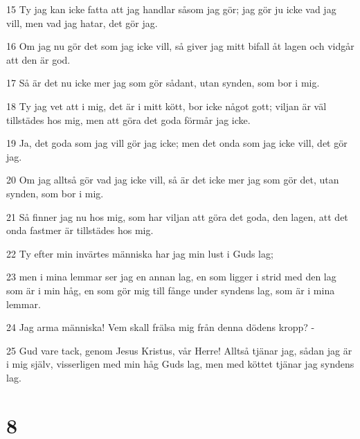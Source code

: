 \par 15 Ty jag kan icke fatta att jag handlar såsom jag gör; jag gör ju icke vad jag vill, men vad jag hatar, det gör jag.
\par 16 Om jag nu gör det som jag icke vill, så giver jag mitt bifall åt lagen och vidgår att den är god.
\par 17 Så är det nu icke mer jag som gör sådant, utan synden, som bor i mig.
\par 18 Ty jag vet att i mig, det är i mitt kött, bor icke något gott; viljan är väl tillstädes hos mig, men att göra det goda förmår jag icke.
\par 19 Ja, det goda som jag vill gör jag icke; men det onda som jag icke vill, det gör jag.
\par 20 Om jag alltså gör vad jag icke vill, så är det icke mer jag som gör det, utan synden, som bor i mig.
\par 21 Så finner jag nu hos mig, som har viljan att göra det goda, den lagen, att det onda fastmer är tillstädes hos mig.
\par 22 Ty efter min invärtes människa har jag min lust i Guds lag;
\par 23 men i mina lemmar ser jag en annan lag, en som ligger i strid med den lag som är i min håg, en som gör mig till fånge under syndens lag, som är i mina lemmar.
\par 24 Jag arma människa! Vem skall frälsa mig från denna dödens kropp? -
\par 25 Gud vare tack, genom Jesus Kristus, vår Herre! Alltså tjänar jag, sådan jag är i mig själv, visserligen med min håg Guds lag, men med köttet tjänar jag syndens lag.

\chapter{8}

